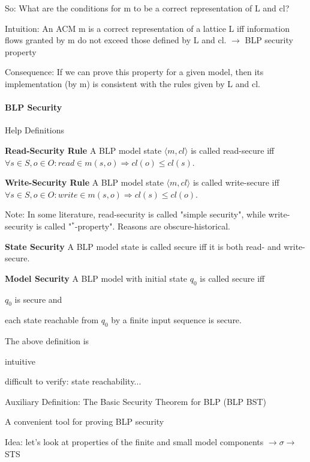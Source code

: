 \documentclass[a4paper]{article}
\renewcommand{\note}[2]{\begin{noteBox} \textbf{#1} #2 \end{noteBox}}
\begin{document}
\begin{multicols}{3}
    So: What are the conditions for m to be a correct representation of L and cl?

    Intuition: An ACM m is a correct representation of a lattice L iff information flows granted by m do not exceed those defined by L and cl. $\rightarrow$ BLP security property

    Consequence: If we can prove this property for a given model, then its implementation (by m) is consistent with the rules given by L and cl.

    \paragraph{BLP Security}
    Help Definitions
    \note{Read-Security Rule}{A BLP model state $⟨m,cl⟩$ is called read-secure iff $\forall s\in S,o\in O:read\in m(s,o)\Rightarrow cl(o) \leq cl(s)$.}

    \note{Write-Security Rule}{A BLP model state $⟨m,cl⟩$ is called write-secure iff $\forall s\in S,o\in O:write\in m(s,o)\Rightarrow cl(s)\leq cl(o)$.}

    Note: In some literature, read-security is called "simple security", while write-security is called "$^*$-property". Reasons are obscure-historical.

    \note{State Security}{A BLP model state is called secure iff it is both read- and write-secure.}

    \note{Model Security}{A BLP model with initial state $q_0$ is called secure iff
        \begin{enumerate*}
            \item $q_0$ is secure and
            \item each state reachable from $q_0$ by a finite input sequence is secure.
        \end{enumerate*}
    }

    The above definition is
    \begin{itemize*}
        \item intuitive
        \item difficult to verify: state reachability...
    \end{itemize*}

    Auxiliary Definition: The Basic Security Theorem for BLP (BLP BST)
    \begin{itemize*}
        \item A convenient tool for proving BLP security
        \item Idea: let’s look at properties of the finite and small model components $\rightarrow\sigma\rightarrow$ STS
    \end{itemize*}


\end{multicols}
\end{document}
